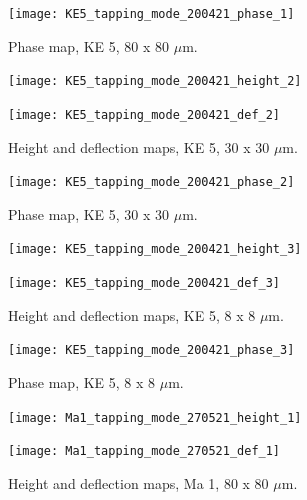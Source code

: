 \begin{figure}[H]
\centering
  \texttt{[image: KE5\_tapping\_mode\_200421\_phase\_1]}
\caption[Phase map, KE 5]{Phase map, KE 5, 80 x 80 $\mu$m.}
\label{fig:afm_ke5_phase_1}
\end{figure}


\begin{figure}[H]
\centering
\begin{minipage}{.45\textwidth}
  \centering
  \texttt{[image: KE5\_tapping\_mode\_200421\_height\_2]}
\end{minipage}
\begin{minipage}{.45\textwidth}
  \centering
  \texttt{[image: KE5\_tapping\_mode\_200421\_def\_2]}
\end{minipage}
\caption[Height and deflection maps, KE 5]{Height and deflection maps, KE 5, 30 x 30 $\mu$m.}
\label{fig:afm_ke5_height_def_2}
\end{figure}

\begin{figure}[H]
\centering
  \texttt{[image: KE5\_tapping\_mode\_200421\_phase\_2]}
\caption[Phase map, KE 5]{Phase map, KE 5, 30 x 30 $\mu$m.}
\label{fig:afm_ke5_phase_2}
\end{figure}


\begin{figure}[H]
\centering
\begin{minipage}{.45\textwidth}
  \centering
  \texttt{[image: KE5\_tapping\_mode\_200421\_height\_3]}
\end{minipage}
\begin{minipage}{.45\textwidth}
  \centering
  \texttt{[image: KE5\_tapping\_mode\_200421\_def\_3]}
\end{minipage}
\caption[Height and deflection maps, KE 5]{Height and deflection maps, KE 5, 8 x 8 $\mu$m.}
\label{fig:afm_ke5_height_def_3}
\end{figure}

\begin{figure}[H]
\centering
  \texttt{[image: KE5\_tapping\_mode\_200421\_phase\_3]}
\caption[Phase map, KE 5]{Phase map, KE 5, 8 x 8 $\mu$m.}
\label{fig:afm_ke5_phase_3}
\end{figure}




\begin{figure}[H]
\centering
\begin{minipage}{.45\textwidth}
  \centering
  \texttt{[image: Ma1\_tapping\_mode\_270521\_height\_1]}
\end{minipage}
\begin{minipage}{.45\textwidth}
  \centering
  \texttt{[image: Ma1\_tapping\_mode\_270521\_def\_1]}
\end{minipage}
\caption[Height and deflection maps, Ma 1]{Height and deflection maps, Ma 1, 80 x 80 $\mu$m.}
\label{fig:afm_ma1_height_def_1}
\end{figure}

